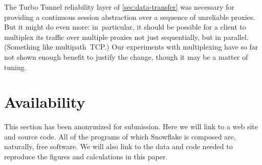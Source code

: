 \documentclass[letterpaper,twocolumn]{article}
\begin{document}
The Turbo Tunnel reliability layer of \autoref{sec:data-transfer}
was necessary for providing a continuous session abstraction
over a sequence of unreliable proxies.
But it might do even more:
in~particular, it should be possible
for a client to multiplex its traffic
over multiple proxies not just sequentially, but in parallel.
(Something like multipath~TCP.)
Our experiments with multiplexing have so far
not shown enough benefit to justify the change,
though it may be a matter of tuning.

\section*{Availability}

This section has been anonymized for submission.
Here we will link to a web site and source code.
All of the programs of which Snowflake is composed are,
naturally, free software.
We will also link to the data and code needed to reproduce
the figures and calculations in this paper.

{
\raggedright


}
\end{document}
